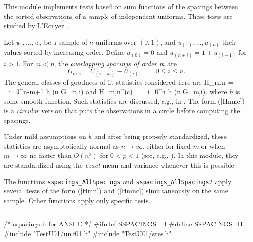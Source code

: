 
This module implements tests based on sum functions of the spacings
between the sorted observations of a sample of independent uniforms.
These tests are studied by L'Ecuyer \cite{rLEC97h}.

Let $u_1,\dots,u_n$ be a sample of $n$ uniforms over $(0,1)$, and
$u_{(1)},\dots, u_{(n)}$ their values sorted by increasing order.
Define $u_{(0)} = 0$ and $u_{(n+i)} = 1 + u_{(i-1)}$ for $i > 1$.
For $m<n$, the {\em overlapping spacings of order $m$\/} are
 $$ G_{m,i} = U_{(i+m)} - U_{(i)},  \qquad  0\le i\le n. $$
The general classes of goodness-of-fit statistics considered here are
\eq
   H_{m,n} = \sum_{i=0}^{n-m+1} h (n G_{m,i})               
\endeq
and
\eq
   H_{m,n}^{(c)} = \sum_{i=0}^n h (n G_{m,i}).              
\endeq
where $h$ is some smooth function.
Such statistics are discussed, e.g., in
\cite{tPYK65a,tKUO81a,tRAO84a,tHAL86a,rLEC97h}.
The form (\ref{Hmnc}) is a {\em circular\/} version that puts the
observations in a circle before computing the spacings.

Under mild assumptions on $h$ and after being properly standardized,
these statistics are asymptotically normal as $n\to\infty$,
either for fixed $m$ or when $m\to\infty$ no faster than $O(n^p)$
for $0 < p < 1$ (see, e.g., \cite{tDEL79a,tHAL86a,tJAM89a,tKUO81a}).
In this module, they are standardized using the {\em exact\/} mean
and variance whenever this is possible.

The functions {\tt sspacings\_AllSpacings} and {\tt sspacings\_AllSpacings2}
apply several tests of the form (\ref{Hmn}) and (\ref{Hmnc}) simultaneously
on the same sample.
Other functions apply only specific tests.

\resdef

\bigskip
\hrule
\code\hide
/* sspacings.h  for ANSI C */
#ifndef SSPACINGS_H
#define SSPACINGS_H
\endhide
#include "TestU01/unif01.h"
#include "TestU01/sres.h"
\endcode

\ifdetailed   %

\code

